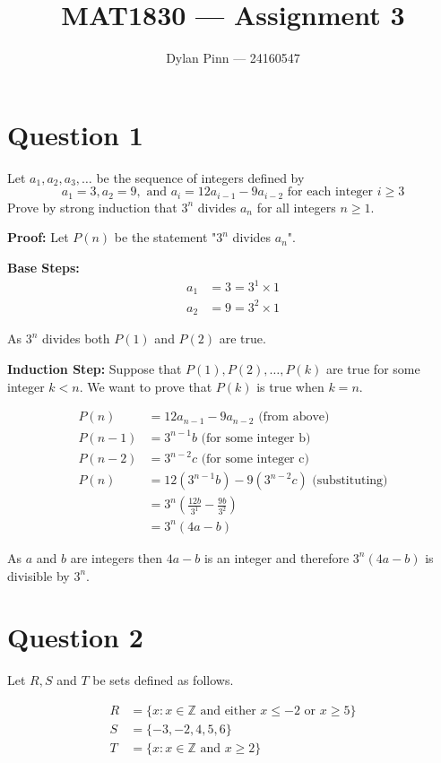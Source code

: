 \documentclass[11pt]{article}
\begin{document}
\title{MAT1830 --- Assignment 3}
\author{Dylan Pinn --- 24160547}
\maketitle

\section*{Question 1}
Let $a_1,a_2,a_3,\dots$ be the sequence of integers defined by
$$a_1=3,a_2=9,\text{ and } a_i=12a_{i-1}-9a_{i-2} \text{ for each integer } i \geq 3$$
Prove by strong induction that $3^n$ divides $a_n$ for all integers $n \geq1$.

\textbf{Proof:} Let $P(n)$ be the statement "$3^n$ divides $a_n$".

\textbf{Base Steps:}
\begin{align*}
	a_1 &= 3 = 3^1 \times 1 \\
	a_2 &= 9 = 3^2 \times 1
\end{align*}

As $3^n$ divides both $P(1)$ and $P(2)$ are true.

\textbf{Induction Step:}
Suppose that $P(1),P(2),\dots,P(k)$ are true for some integer $k < n$. We want to prove that $P(k)$ is true when $k = n$.

\begin{align*}
	P(n) &= 12a_{n-1} - 9a_{n-2} \text{ (from above) } \\
	P(n-1) &= 3^{n-1}b \text{ (for some integer b)} \\
	P(n-2) &= 3^{n-2}c \text{ (for some integer c)} \\
	P(n) &= 12(3^{n-1}b) - 9(3^{n-2}c) \text{ (substituting)} \\
	&= 3^n(\frac{12b}{3^1} - \frac{9b}{3^2}) \\
	&= 3^n(4a - b)
\end{align*}

As $a$ and $b$ are integers then $4a-b$ is an integer and therefore $3^n(4a-b)$ is divisible by $3^n$.


\break
\section*{Question 2}
Let $R,S$ and $T$ be sets defined as follows.

\begin{align*}
	R &= \{ x: x \in \mathbb{Z} \text{ and either } x \leq -2 \text{ or } x \geq 5 \} \\
	S &= \{ -3,-2,4,5,6 \} \\
	T &= \{ x: x \in \mathbb{Z} \text{ and } x \geq 2 \}
\end{align*}
\end{document}
